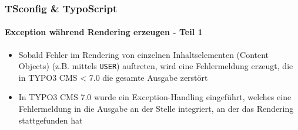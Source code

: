 
\begin{frame}[fragile]
	\frametitle{TSconfig \& TypoScript}
	\framesubtitle{Exception während Rendering erzeugen - Teil 1}

	\begin{itemize}
		\item Sobald Fehler im Rendering von einzelnen Inhaltselementen (Content Objects) (z.B. mittels \texttt{USER}) auftreten, wird eine Fehlermeldung erzeugt, die in TYPO3 CMS < 7.0 die gesamte Ausgabe zerstört
		\item In TYPO3 CMS 7.0 wurde ein Exception-Handling eingeführt, welches eine Fehlermeldung in die Ausgabe an der Stelle integriert, an der das Rendering stattgefunden hat
	\end{itemize}

\end{frame}


